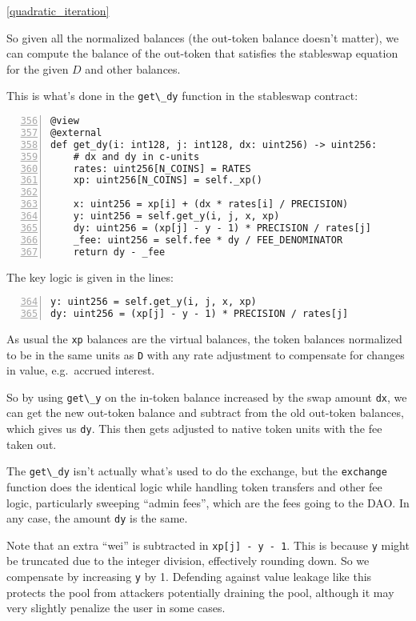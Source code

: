 \documentclass[
]{article}
\newcommand{\passthrough}[1]{#1}
\begin{document}
\ref{quadratic_iteration}

So given all the normalized balances (the out-token balance doesn't
matter), we can compute the balance of the out-token that satisfies the
stableswap equation for the given \(D\) and other balances.

This is what's done in the \passthrough{\lstinline!get\_dy!} function in
the stableswap contract:

\begin{lstlisting}[numbers=left, firstnumber=356, label=get_dy]
@view
@external
def get_dy(i: int128, j: int128, dx: uint256) -> uint256:
    # dx and dy in c-units
    rates: uint256[N_COINS] = RATES
    xp: uint256[N_COINS] = self._xp()

    x: uint256 = xp[i] + (dx * rates[i] / PRECISION)
    y: uint256 = self.get_y(i, j, x, xp)
    dy: uint256 = (xp[j] - y - 1) * PRECISION / rates[j]
    _fee: uint256 = self.fee * dy / FEE_DENOMINATOR
    return dy - _fee
\end{lstlisting}

The key logic is given in the lines:

\begin{lstlisting}[numbers=left, firstnumber=364]
y: uint256 = self.get_y(i, j, x, xp)
dy: uint256 = (xp[j] - y - 1) * PRECISION / rates[j]
\end{lstlisting}

As usual the \passthrough{\lstinline!xp!} balances are the virtual
balances, the token balances normalized to be in the same units as
\passthrough{\lstinline!D!} with any rate adjustment to compensate for
changes in value, e.g.~accrued interest.

So by using \passthrough{\lstinline!get\_y!} on the in-token balance
increased by the swap amount \passthrough{\lstinline!dx!}, we can get
the new out-token balance and subtract from the old out-token balances,
which gives us \passthrough{\lstinline!dy!}. This then gets adjusted to
native token units with the fee taken out.

The \passthrough{\lstinline!get\_dy!} isn't actually what's used to do
the exchange, but the \passthrough{\lstinline!exchange!} function does
the identical logic while handling token transfers and other fee logic,
particularly sweeping ``admin fees'', which are the fees going to the
DAO. In any case, the amount \passthrough{\lstinline!dy!} is the same.

Note that an extra ``wei'' is subtracted in
\passthrough{\lstinline!xp[j] - y - 1!}. This is because
\passthrough{\lstinline!y!} might be truncated due to the integer
division, effectively rounding down. So we compensate by increasing
\passthrough{\lstinline!y!} by 1. Defending against value leakage like
this protects the pool from attackers potentially draining the pool,
although it may very slightly penalize the user in some cases.
\end{document}
